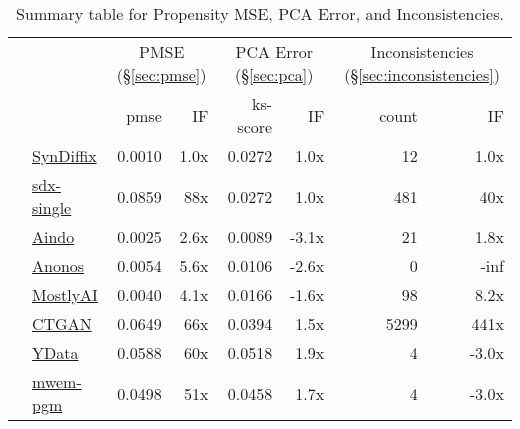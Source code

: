 \begin{table}
    \centering
    \caption{Summary table for Propensity MSE, PCA Error, and Inconsistencies.}
    \label{tab:pmse}
    \small
    \begin{tabular}{llr@{\hskip 6pt}r@{\hskip 14pt}r@{\hskip 6pt}r@{\hskip 14pt}rr}
        \toprule
          &   & \multicolumn{2}{c}{PMSE (\S\ref{sec:pmse})} & \multicolumn{2}{c}{PCA Error (\S\ref{sec:pca})} & \multicolumn{2}{c}{Inconsistencies (\S\ref{sec:inconsistencies})} \\
        
 & & pmse & IF & ks-score & IF & count & IF \\
\midrule
        \cellcolor{blue} & \href{https://htmlpreview.github.io/?https://github.com/yoid2000/sdnist-summary/blob/main/results/syndiffix_all/report.html}{SynDiffix} & 0.0010 & 1.0x & 0.0272 & 1.0x & 12 & 1.0x \\
        \cellcolor{blue} & \href{https://htmlpreview.github.io/?https://github.com/yoid2000/sdnist-summary/blob/main/results/sdx-single/report.html}{sdx-single} & 0.0859 & 88x & 0.0272 & 1.0x & 481 & 40x \\
        \cellcolor{red} & \href{https://htmlpreview.github.io/?https://github.com/yoid2000/sdnist-summary/blob/main/results/aindo_synth/report.html}{Aindo} & 0.0025 & 2.6x & 0.0089 & -3.1x & 21 & 1.8x \\
        \cellcolor{red} & \href{https://htmlpreview.github.io/?https://github.com/yoid2000/sdnist-summary/blob/main/results/anonos_sdk/report.html}{Anonos} & 0.0054 & 5.6x & 0.0106 & -2.6x & 0 & -inf \\
        \cellcolor{red} & \href{https://htmlpreview.github.io/?https://github.com/yoid2000/sdnist-summary/blob/main/results/mostlyai_sd_platform/report.html}{MostlyAI} & 0.0040 & 4.1x & 0.0166 & -1.6x & 98 & 8.2x \\
        \cellcolor{red} & \href{https://htmlpreview.github.io/?https://github.com/yoid2000/sdnist-summary/blob/main/results/sdv_ctgan_epochs1000/report.html}{CTGAN} & 0.0649 & 66x & 0.0394 & 1.5x & 5299 & 441x \\
        \cellcolor{pink} & \href{https://htmlpreview.github.io/?https://github.com/yoid2000/sdnist-summary/blob/main/results/ydata_fabric_synthesizers/report.html}{YData} & 0.0588 & 60x & 0.0518 & 1.9x & 4 & -3.0x \\
        \cellcolor{ForestGreen} & \href{https://htmlpreview.github.io/?https://github.com/yoid2000/sdnist-summary/blob/main/results/mwem_pgm/report.html}{mwem-pgm} & 0.0498 & 51x & 0.0458 & 1.7x & 4 & -3.0x \\

\end{tabular}
\end{table}
